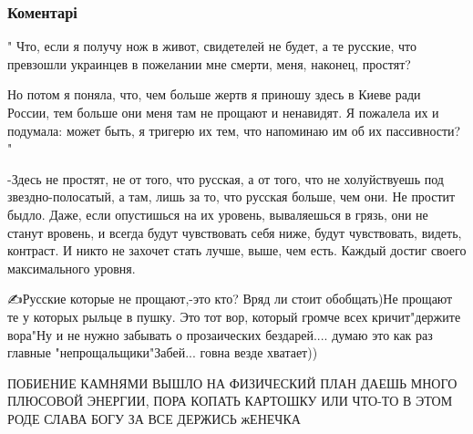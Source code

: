  
 
 
 
 
\subsubsection{Коментарі}
\label{sec:18_09_2021.fb.nikonov_sergej.2.bilchenko_proschanie_s_proshlim_veschi.cmt}

\begin{itemize} %

" Что, если я получу нож в живот, свидетелей не будет, а те русские, что
превзошли украинцев в пожелании мне смерти, меня, наконец, простят?

Но потом я поняла, что, чем больше жертв я приношу здесь в Киеве ради России,
тем больше они меня там не прощают и ненавидят. Я пожалела их и подумала: может
быть, я тригерю их тем, что напоминаю им об их пассивности? "

-Здесь не простят, не от того, что русская, а от того, что не холуйствуешь под
звездно-полосатый, а там, лишь за то, что русская больше, чем они. Не простит
быдло. Даже, если опустишься на их уровень, вываляешься в грязь, они не станут
вровень, и всегда будут чувствовать себя ниже, будут чувствовать, видеть,
контраст. И никто не захочет стать лучше, выше, чем есть. Каждый достиг своего
максимального уровня.


✍Русские которые не прощают,-это кто? Вряд ли стоит обобщать)Не прощают те у
которых рыльце в пушку. Это тот вор, который громче всех кричит"держите вора"Ну и
не нужно забывать о прозаических бездарей.... думаю это как раз главные
"непрощальщики"Забей... говна везде хватает))



ПОБИЕНИЕ КАМНЯМИ ВЫШЛО НА ФИЗИЧЕСКИЙ ПЛАН ДАЕШЬ МНОГО ПЛЮСОВОЙ ЭНЕРГИИ, ПОРА
КОПАТЬ КАРТОШКУ ИЛИ ЧТО-ТО В ЭТОМ РОДЕ СЛАВА БОГУ ЗА ВСЕ ДЕРЖИСЬ жЕНЕЧКА

\end{itemize} %

